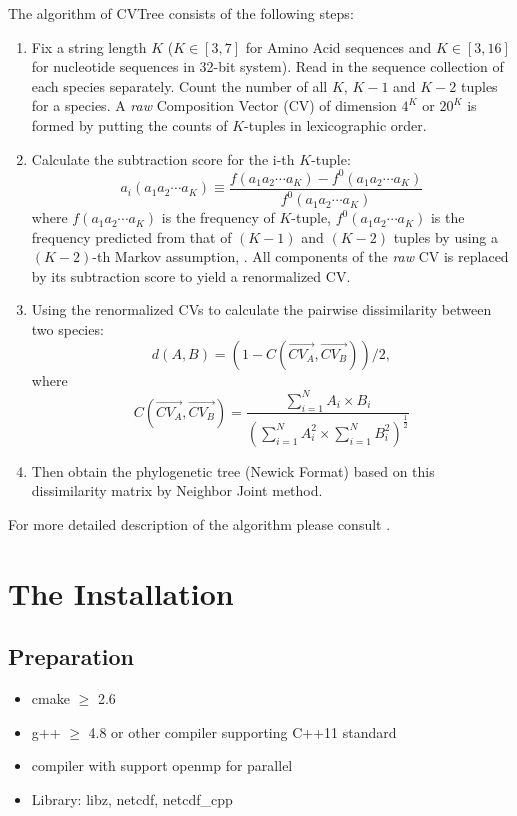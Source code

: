 \documentclass[a4paper,12pt]{article}
\begin{document}
The algorithm of CVTree consists of the following steps:
\begin{enumerate}\itemsep 0pt
\item Fix a string length $K$ ($K\in [3,7]$ for Amino Acid sequences and
  $K\in [3,16]$ for nucleotide sequences in 32-bit system). Read in the
  sequence collection of each species separately. Count the number of
  all $K$, $K-1$ and $K-2$ tuples for a species. A {\it raw} Composition
  Vector (CV) of dimension $4^K$ or ${20}^K$ is formed by putting the
  counts of $K$-tuples in lexicographic order.
  \item Calculate the subtraction score for the i-th $K$-tuple:
\begin{equation*}
  a_i(a_1a_2 \cdots a_K) \equiv \frac{f(a_1a_2 \cdots a_K) -
    f^0(a_1a_2 \cdots a_K)}{f^0(a_1a_2 \cdots a_K)}
\end{equation*}
where $f(a_1a_2 \cdots a_K)$ is the frequency of $K$-tuple, $f^0(a_1a_2
\cdots a_K)$ is the frequency predicted from that of $(K-1)$ and $(K-2)$
tuples by using a $(K-2)$-th Markov assumption, \cite{qwh04}.  All
components of the {\it raw} CV is replaced by its subtraction score to
yield a renormalized CV.
\item Using the renormalized CVs to calculate the pairwise dissimilarity
  between two species:
  $$d(A, B)=(1-C(\vec{CV_A},\vec{CV_B}))/2,$$
where
\begin{equation*}
  C(\vec{CV_A},\vec{CV_B})=\frac{\sum_{i=1}^NA_i \times
    B_i}{(\sum_{i=1}^NA_i^2 \times \sum_{i=1}^NB_i^2)^{\frac{1}{2}}}
\end{equation*}

\item Then obtain the phylogenetic tree (Newick Format) based on this
  dissimilarity matrix by Neighbor Joint method.
\end{enumerate}
For more detailed description of the algorithm please consult
\cite{qwh04}. 



\section{The Installation}
\subsection{Preparation}
\begin{itemize}
	\item cmake $\geq$ 2.6
  \item g++ $\geq$ 4.8 or other compiler supporting C++11 standard
  \item compiler with support openmp for parallel
	\item Library: libz, netcdf, netcdf\_cpp
\end{itemize}
\end{document}
